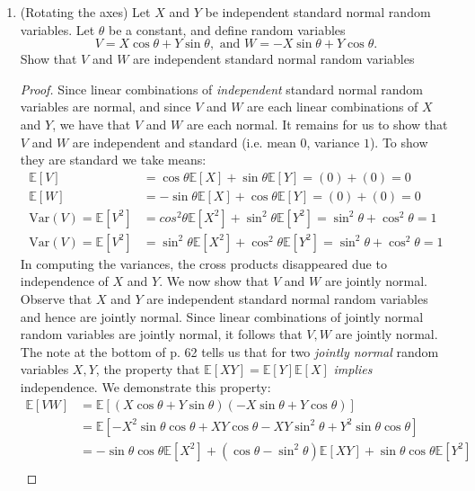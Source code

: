 \documentclass{article}
\makeatletter
\newcommand{\E}{\mathbb{E}}
\newcommand{\Var}{\mathrm{Var}}
\newcommand{\mylabel}[2]{#2\def\@currentlabel{#2}\label{#1}}
\newcommand{\pr}[1]{ \item[\mylabel{}{#1.}]}
\theoremstyle{definition}
\theoremstyle{definition}
\makeatother
\begin{document}
\begin{enumerate}
\begin{enumerate}[(i)]
\begin{proof}
\end{proof}

    \end{enumerate}
    
    \pr{2.3}(Rotating the axes) Let $X$ and $Y$ be independent standard normal random variables. Let $\theta$ be a constant, and define random variables 
    $$V = X \cos \theta + Y \sin \theta, \text{ and } W = -X \sin\theta + Y \cos\theta.$$
    Show that $V$ and $W$ are independent standard normal random variables
    
    \begin{proof}
    Since linear combinations of \textit{independent} standard normal random variables are normal, and since $V$ and $W$ are each linear combinations of $X$ and $Y$, we have that $V$ and $W$ are each normal. It remains for us to show that $V$ and $W$ are independent and standard (i.e. mean $0$, variance $1$). To show they are standard we take means:
    \begin{align*}
        \E[V] &= \cos\theta\E[X] +\sin\theta\E[Y] = (0)+(0) = 0 \\
        \E[W] &= -\sin\theta\E[X] +\cos\theta\E[Y] = (0)+(0) = 0 \\
        \Var(V) = \E[V^2] &=cos^2\theta\E[X^2] +\sin^2\theta\E[Y^2] = \sin^2\theta+\cos^2\theta = 1 \\
             \Var(V) = \E[V^2] &=\sin^2\theta\E[X^2] +\cos^2\theta\E[Y^2] = \sin^2\theta+\cos^2\theta = 1
    \end{align*}
    In computing the variances, the cross products disappeared due to independence of $X$ and $Y$. We now show that $V$ and $W$ are jointly normal. Observe that $X$ and $Y$ are independent standard normal random variables and hence are jointly normal. Since linear combinations of jointly normal random variables are jointly normal, it follows that $V,W$ are jointly normal. The note at the bottom of p. 62 tells us that for two \textit{jointly normal} random variables $X,Y$, the property that $\E[XY]=\E[Y]\E[X]$ \textit{implies} independence. We demonstrate this property:
    \begin{align}
        \E[VW] &= \E\left[ \left(X \cos \theta + Y \sin \theta \right) \left(  -X \sin\theta + Y \cos\theta \right) \right]\\
        &= \E\left[-X^2\sin \theta \cos \theta + XY \cos \theta -XY\sin^2 \theta +Y^2 \sin \theta \cos \theta\right]\\ 
        & = -\sin \theta \cos \theta \E[X^2] +  (\cos \theta -\sin^2\theta) \E[XY] +\sin \theta \cos \theta\E[Y^2] \\ 

\end{align}
\end{proof}
\end{enumerate}
\end{document}
